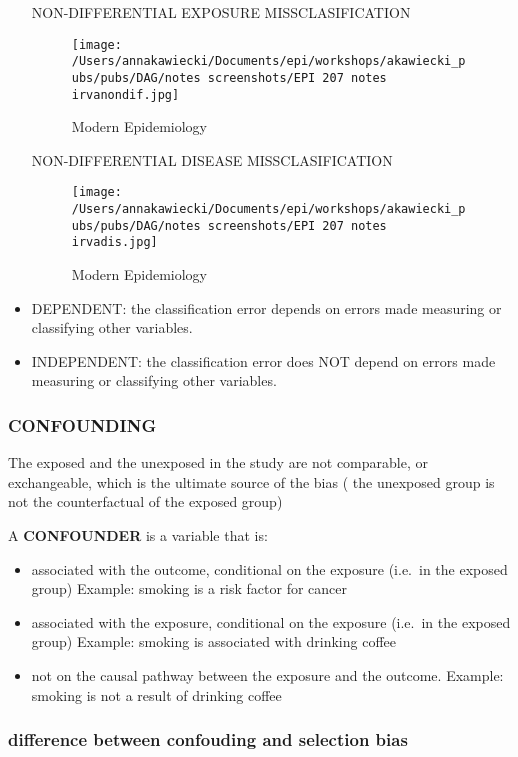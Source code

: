 \documentclass[
]{article}
\begin{document}
\begin{itemize}
  NON-DIFFERENTIAL EXPOSURE MISSCLASIFICATION

  \begin{figure}
  \centering
  \texttt{[image: /Users/annakawiecki/Documents/epi/workshops/akawiecki\_pubs/pubs/DAG/notes screenshots/EPI 207 notes irvanondif.jpg]}
  \caption{Modern Epidemiology}
  \end{figure}

  NON-DIFFERENTIAL DISEASE MISSCLASIFICATION

  \begin{figure}
  \centering
  \texttt{[image: /Users/annakawiecki/Documents/epi/workshops/akawiecki\_pubs/pubs/DAG/notes screenshots/EPI 207 notes irvadis.jpg]}
  \caption{Modern Epidemiology}
  \end{figure}
\item
  DEPENDENT: the classification error depends on errors made measuring
  or classifying other variables.
\item
  INDEPENDENT: the classification error does NOT depend on errors made
  measuring or classifying other variables.
\end{itemize}

\hypertarget{confounding}{%
\subsubsection{CONFOUNDING}\label{confounding}}

The exposed and the unexposed in the study are not comparable, or
exchangeable, which is the ultimate source of the bias ( the unexposed
group is not the counterfactual of the exposed group)

A \textbf{CONFOUNDER} is a variable that is:

\begin{itemize}
\item
  associated with the outcome, conditional on the exposure (i.e.~in the
  exposed group) Example: smoking is a risk factor for cancer
\item
  associated with the exposure, conditional on the exposure (i.e.~in the
  exposed group) Example: smoking is associated with drinking coffee
\item
  not on the causal pathway between the exposure and the outcome.
  Example: smoking is not a result of drinking coffee
\end{itemize}

\hypertarget{difference-between-confouding-and-selection-bias}{%
\subsubsection{difference between confouding and selection
bias}\label{difference-between-confouding-and-selection-bias}}
\end{document}
